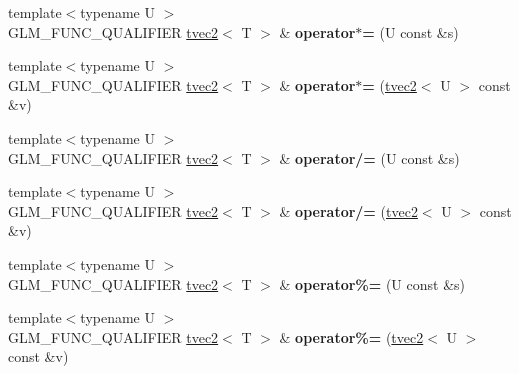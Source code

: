 \begin{DoxyCompactItemize}
\item 
\hypertarget{structglm_1_1detail_1_1tvec2_a77e4780649d39846f10151a2f1128141}{}{\footnotesize template$<$typename U $>$ }\\G\+L\+M\+\_\+\+F\+U\+N\+C\+\_\+\+Q\+U\+A\+L\+I\+F\+I\+E\+R \hyperlink{structglm_1_1detail_1_1tvec2}{tvec2}$<$ T $>$ \& {\bfseries operator$\ast$=} (U const \&s)\label{structglm_1_1detail_1_1tvec2_a77e4780649d39846f10151a2f1128141}

\item 
\hypertarget{structglm_1_1detail_1_1tvec2_a09d1e3313484e44a17bfdb50167670a5}{}{\footnotesize template$<$typename U $>$ }\\G\+L\+M\+\_\+\+F\+U\+N\+C\+\_\+\+Q\+U\+A\+L\+I\+F\+I\+E\+R \hyperlink{structglm_1_1detail_1_1tvec2}{tvec2}$<$ T $>$ \& {\bfseries operator$\ast$=} (\hyperlink{structglm_1_1detail_1_1tvec2}{tvec2}$<$ U $>$ const \&v)\label{structglm_1_1detail_1_1tvec2_a09d1e3313484e44a17bfdb50167670a5}

\item 
\hypertarget{structglm_1_1detail_1_1tvec2_a8eda19ea5ffa0cab5d30122313fb6f5d}{}{\footnotesize template$<$typename U $>$ }\\G\+L\+M\+\_\+\+F\+U\+N\+C\+\_\+\+Q\+U\+A\+L\+I\+F\+I\+E\+R \hyperlink{structglm_1_1detail_1_1tvec2}{tvec2}$<$ T $>$ \& {\bfseries operator/=} (U const \&s)\label{structglm_1_1detail_1_1tvec2_a8eda19ea5ffa0cab5d30122313fb6f5d}

\item 
\hypertarget{structglm_1_1detail_1_1tvec2_a993ef4db9669426751839ce2f6c575b7}{}{\footnotesize template$<$typename U $>$ }\\G\+L\+M\+\_\+\+F\+U\+N\+C\+\_\+\+Q\+U\+A\+L\+I\+F\+I\+E\+R \hyperlink{structglm_1_1detail_1_1tvec2}{tvec2}$<$ T $>$ \& {\bfseries operator/=} (\hyperlink{structglm_1_1detail_1_1tvec2}{tvec2}$<$ U $>$ const \&v)\label{structglm_1_1detail_1_1tvec2_a993ef4db9669426751839ce2f6c575b7}

\item 
\hypertarget{structglm_1_1detail_1_1tvec2_a4c0d9778afdee006437be0d93ff681df}{}{\footnotesize template$<$typename U $>$ }\\G\+L\+M\+\_\+\+F\+U\+N\+C\+\_\+\+Q\+U\+A\+L\+I\+F\+I\+E\+R \hyperlink{structglm_1_1detail_1_1tvec2}{tvec2}$<$ T $>$ \& {\bfseries operator\%=} (U const \&s)\label{structglm_1_1detail_1_1tvec2_a4c0d9778afdee006437be0d93ff681df}

\item 
\hypertarget{structglm_1_1detail_1_1tvec2_a295cc271433cdbd9c6976b210facff5e}{}{\footnotesize template$<$typename U $>$ }\\G\+L\+M\+\_\+\+F\+U\+N\+C\+\_\+\+Q\+U\+A\+L\+I\+F\+I\+E\+R \hyperlink{structglm_1_1detail_1_1tvec2}{tvec2}$<$ T $>$ \& {\bfseries operator\%=} (\hyperlink{structglm_1_1detail_1_1tvec2}{tvec2}$<$ U $>$ const \&v)\label{structglm_1_1detail_1_1tvec2_a295cc271433cdbd9c6976b210facff5e}


\end{DoxyCompactItemize}
